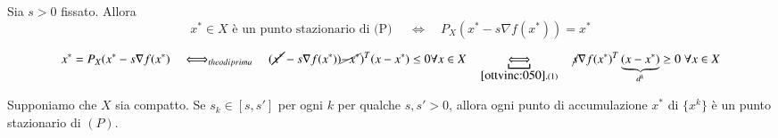 \begin{proposition}
\label{prop:proiettato-stazionario}
Sia $s > 0$ fissato. Allora
$$ x^{*} \in X \text{ \`e un punto stazionario di (P) }
\quad \Longleftrightarrow \quad
P_{X}(x^{*} - s \nabla f(x^{*})) = x^{*}
$$
\end{proposition}

\begin{thproof}
$$x^{*} = P_{X} (x^{*} - s\nabla f(x^{*})
\quad
\Longleftrightarrow_{theo di prima}
\quad
(\cancel{x^{*}} - s  \nabla f(x^{*})) \cancel{- x^{*}})^{T}
 (x-x^{*}) \leq 0 \forall x \in X
\quad
\underbracket{\Longleftrightarrow}_{\ref{ottvinc:050}.(1)}
\quad
\cancel{s} \nabla f(x^{*})^{T}\underbrace{(x-x^{*})}_{d^k} \geq 0 \; \forall x \in X
$$
\end{thproof}

\begin{theo}[Convergenza]
Supponiamo che $X$ sia compatto. Se $s_k \in [s, s']$ per ogni $k$
per qualche $s, s'> 0$, allora ogni punto di accumulazione
$x^{*}$ di $\{x^{k}\}$ \`e un punto stazionario di $(P)$.
\end{theo}

